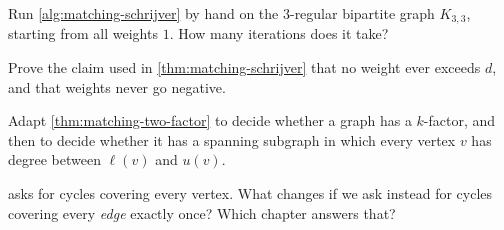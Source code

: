 \begin{exercise}
Run \cref{alg:matching-schrijver} by hand on the $3$-regular bipartite graph
$K_{3,3}$, starting from all weights $1$. How many iterations does it take?
\end{exercise}

\begin{exercise}
Prove the claim used in \cref{thm:matching-schrijver} that no weight ever
exceeds $d$, and that weights never go negative.
\end{exercise}

\begin{exercise}
Adapt \cref{thm:matching-two-factor} to decide whether a graph has a
$k$-factor, and then to decide whether it has a spanning subgraph in which every
vertex $v$ has degree between $\ell(v)$ and $u(v)$.
\end{exercise}

\begin{exercise}
 asks for cycles covering every vertex. What
changes if we ask instead for cycles covering every \emph{edge} exactly once?
Which chapter answers that?
\end{exercise}
